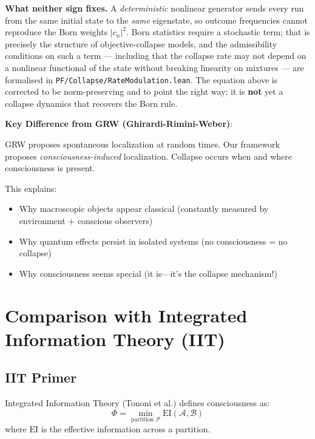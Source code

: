 \begin{level3}
\begin{remark}
\textbf{What neither sign fixes.} A \emph{deterministic} nonlinear generator
sends every run from the same initial state to the \emph{same} eigenstate, so
outcome frequencies cannot reproduce the Born weights $|c_n|^2$. Born statistics
require a stochastic term; that is precisely the structure of objective-collapse
models, and the admissibility conditions on such a term --- including that the
collapse rate may not depend on a nonlinear functional of the state without
breaking linearity on mixtures --- are formalised in
\texttt{PF/\allowbreak{}Collapse/\allowbreak{}RateModulation.\allowbreak{}lean}.
The equation above is corrected to be norm-preserving and to point the right way;
it is \textbf{not} yet a collapse dynamics that recovers the Born rule.
\end{remark}

\textbf{Key Difference from GRW (Ghirardi-Rimini-Weber)}:

GRW proposes spontaneous localization at random times. Our framework proposes \textit{consciousness-induced} localization. Collapse occurs when and where consciousness is present.

This explains:
\begin{itemize}
\item Why macroscopic objects appear classical (constantly measured by environment + conscious observers)
\item Why quantum effects persist in isolated systems (no consciousness = no collapse)
\item Why consciousness seems special (it is—it's the collapse mechanism!)
\end{itemize}
\end{level3}

\section{Comparison with Integrated Information Theory (IIT)}

\subsection{IIT Primer}

Integrated Information Theory\cite{tononi2004,tononi2016,koch2016} (Tononi et al.) defines consciousness as:
\begin{equation}
\Phi = \min_{\text{partition } \mathcal{P}} \text{EI}(\mathcal{A}, \mathcal{B})
\end{equation}
where $\text{EI}$ is the effective information across a partition.

